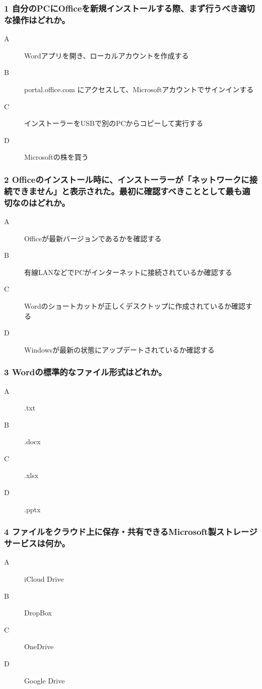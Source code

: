 \documentclass[a4paper,6pt]{jsarticle}
\begin{document}
\subsubsection*{1 自分のPCにOfficeを新規インストールする際、まず行うべき適切な操作はどれか。}
\begin{description}
  \item[A] Wordアプリを開き、ローカルアカウントを作成する
  \item[B] portal.office.com にアクセスして、Microsoftアカウントでサインインする
  \item[C] インストーラーをUSBで別のPCからコピーして実行する
  \item[D] Microsoftの株を買う
\end{description}

\subsubsection*{2 Officeのインストール時に、インストーラーが「ネットワークに接続できません」と表示された。最初に確認すべきこととして最も適切なのはどれか。}
\begin{description}
  \item[A] Officeが最新バージョンであるかを確認する
  \item[B] 有線LANなどでPCがインターネットに接続されているか確認する
  \item[C] Wordのショートカットが正しくデスクトップに作成されているか確認する
  \item[D] Windowsが最新の状態にアップデートされているか確認する
\end{description}

\subsubsection*{3 Wordの標準的なファイル形式はどれか。}
\begin{description}
  \item[A] .txt
  \item[B] .docx
  \item[C] .xlsx
  \item[D] .pptx
\end{description}

\subsubsection*{4 ファイルをクラウド上に保存・共有できるMicrosoft製ストレージサービスは何か。}
\begin{description}
  \item[A] iCloud Drive
  \item[B] DropBox
  \item[C] OneDrive
  \item[D] Google Drive
\end{description}
\end{document}
